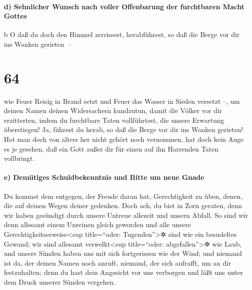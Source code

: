 \hypertarget{d-sehnlicher-wunsch-nach-voller-offenbarung-der-furchtbaren-macht-gottes}{%
\paragraph{d) Sehnlicher Wunsch nach voller Offenbarung der furchtbaren
Macht
Gottes}\label{d-sehnlicher-wunsch-nach-voller-offenbarung-der-furchtbaren-macht-gottes}}

b O daß du doch den Himmel zerrissest, herabführest, so daß die Berge
vor dir ins Wanken gerieten~--

\hypertarget{section-63}{%
\section{64}\label{section-63}}

wie Feuer Reisig in Brand setzt und Feuer das Wasser in
Sieden versetzt --, um deinen Namen deinen Widersachern kundzutun, damit
die Völker vor dir erzitterten, indem du furchtbare Taten
vollführtest, die unsere Erwartung überstiegen! Ja, führest du herab, so
daß die Berge vor dir ins Wanken gerieten! Hat man doch
von alters her nicht gehört noch vernommen, hat doch kein Auge es je
gesehen, daß ein Gott außer dir für einen auf ihn Harrenden Taten
vollbringt.

\hypertarget{e-demuxfctiges-schuldbekenntnis-und-bitte-um-neue-gnade}{%
\paragraph{e) Demütiges Schuldbekenntnis und Bitte um neue
Gnade}\label{e-demuxfctiges-schuldbekenntnis-und-bitte-um-neue-gnade}}

Du kommst dem entgegen, der Freude daran hat,
Gerechtigkeit zu üben, denen, die auf deinen Wegen deiner gedenken. Doch
ach, du bist in Zorn geraten, denn wir haben gesündigt durch unsere
Untreue allezeit und unsern Abfall. So sind wir denn
allesamt einem Unreinen gleich geworden und alle unsere
Gerechtigkeitserweise\textless sup title=``oder: Tugenden''\textgreater✲
sind wie ein besudeltes Gewand; wir sind allesamt verwelkt\textless sup
title=``oder: abgefallen''\textgreater✲ wie Laub, und unsere Sünden
haben uns mit sich fortgerissen wie der Wind; und niemand
ist da, der deinen Namen noch anruft, niemand, der sich aufrafft, um an
dir festzuhalten; denn du hast dein Angesicht vor uns verborgen und läßt
uns unter dem Druck unserer Sünden vergehen.

